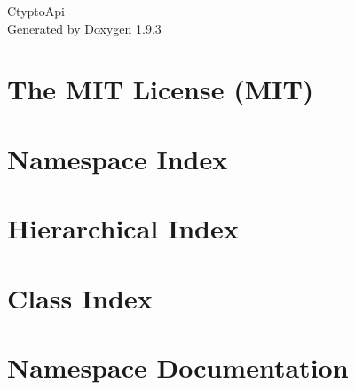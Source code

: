 \documentclass[twoside]{book}
\newcommand{\+}{\discretionary{\mbox{\scriptsize$\hookleftarrow$}}{}{}}
\newcommand{\clearemptydoublepage}{%
    \newpage{\pagestyle{empty}\cleardoublepage}%
  }
\begin{document}
  \raggedbottom
    \hypersetup{pageanchor=false,
                bookmarksnumbered=true,
                pdfencoding=unicode
               }
  \begin{titlepage}
  \vspace*{7cm}
  \begin{center}%
  {\Large Ctypto\+Api}\\
  \vspace*{1cm}
  {\large Generated by Doxygen 1.9.3}\\
  \end{center}
  \end{titlepage}
  \clearemptydoublepage
  \tableofcontents
  \clearemptydoublepage
  \hypersetup{pageanchor=true}
\chapter{The MIT License (MIT)}
\label{md_wwwroot_lib_jquery_validation__l_i_c_e_n_s_e}

\chapter{Namespace Index}

\chapter{Hierarchical Index}

\chapter{Class Index}

\chapter{Namespace Documentation}







\end{document}
